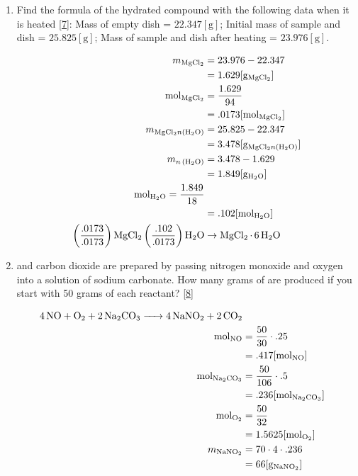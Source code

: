 \documentclass[12pt]{article}
\begin{document}
\begin{enumerate}
  \item Find the formula of the hydrated compound  with the following data when it is heated \eqref{7}: Mass of empty dish = $22.347[\si{\gram}]$; Initial mass of sample and dish = $25.825[\si{\gram}]$; Mass of sample and dish after heating = $23.976[\si{\gram}]$.

    \begin{equation}
      \begin{split}
        m_{\ce{MgCl2}} & = 23.976-22.347 \\
        & = 1.629[\si{\gram}_{\ce{MgCl2}}] \\
        \si{\mole}_{\ce{MgCl2}} & = \frac{1.629}{94} \\
        & = .0173[\si{\mole}_{\ce{MgCl2}}] \\ 
        m_{\ce{MgCl2$n$(H2O)}} & = 25.825-22.347\\
        & = 3.478[\si{\gram}_{\ce{MgCl2$n$(H2O)}}]\\
        m_{\ce{$n$(H2O)}} & = 3.478-1.629 \\
        & = 1.849[\si{\gram}_{\ce{H2O}}] \\
        \si{\mole}_{\ce{H2O}} = \frac{1.849}{18} \\
        & = .102[\si{\mole}_{\ce{H2O}}] \\
        \left( \frac{.0173}{.0173} \right)\ce{MgCl2}\left( \frac{.102}{.0173} \right)\ce{H2O} & \rightarrow \ce{MgCl2*6H2O}
      \end{split}
      \label{7}
    \end{equation}

  \item {} and carbon dioxide are prepared by passing nitrogen monoxide and oxygen into a solution of sodium carbonate. How many grams of  are produced if you start with 50 grams of each reactant? \eqref{8}

    \begin{equation}
      \begin{split}
        \ce{4NO + O2 + 2Na2CO3 ->  4NaNO2 + 2CO2}\\
        \si{\mole}_{\ce{NO}} & = \frac{50}{30}\cdot.25\\
        & = .417[\si{\mole}_{\ce{NO}}]\\
        \si{\mole}_{\ce{Na2CO3}} & = \frac{50}{106} \cdot .5 \\
        & = .236[\si{\mole}_{\ce{Na2CO3}}]\\
        \si{\mole}_{\ce{O2}} & = \frac{50}{32} \\
        & = 1.5625[\si{\mole}_{\ce{O2}}]\\
        m_{\ce{NaNO2}} & = 70\cdot4\cdot.236 \\
        & = 66[\si{\gram}_{\ce{NaNO2}}]  
      \end{split}
      \label{8}
    \end{equation}


\end{enumerate}
\end{document}
